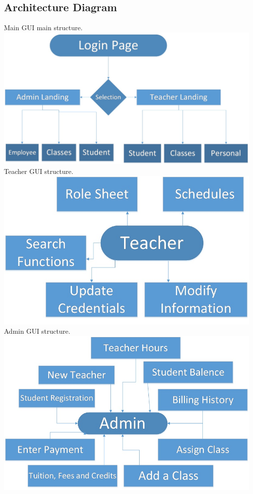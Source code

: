 \subsection{ Architecture  Diagram}
Main GUI main structure.\\
\includegraphics[scale=0.5]{pics/GUI_digram.jpg}\\
Teacher GUI structure.\\
\includegraphics[scale=0.5]{pics/TeacherFunctions.jpg}\\
Admin GUI structure.\\
\includegraphics[scale=0.5]{pics/AdminFunctions.jpg}


